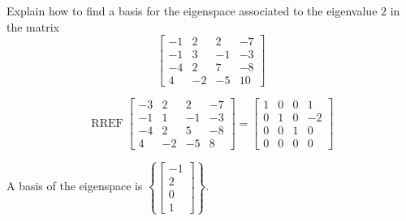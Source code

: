 
\begin{exerciseStatement}


Explain how to find a basis for the eigenspace associated to the eigenvalue \( 2 \) in the matrix \[ \left[\begin{array}{cccc}
-1 & 2 & 2 & -7 \\
-1 & 3 & -1 & -3 \\
-4 & 2 & 7 & -8 \\
4 & -2 & -5 & 10
\end{array}\right] \]


\end{exerciseStatement}
    
\begin{exerciseAnswer} 


\[\operatorname{RREF} \left[\begin{array}{cccc}
-3 & 2 & 2 & -7 \\
-1 & 1 & -1 & -3 \\
-4 & 2 & 5 & -8 \\
4 & -2 & -5 & 8
\end{array}\right] = \left[\begin{array}{cccc}
1 & 0 & 0 & 1 \\
0 & 1 & 0 & -2 \\
0 & 0 & 1 & 0 \\
0 & 0 & 0 & 0
\end{array}\right] \]



A basis of the eigenspace is \( \left\{ \left[\begin{array}{c}
-1 \\
2 \\
0 \\
1
\end{array}\right] \right\} \).


\end{exerciseAnswer}
    
